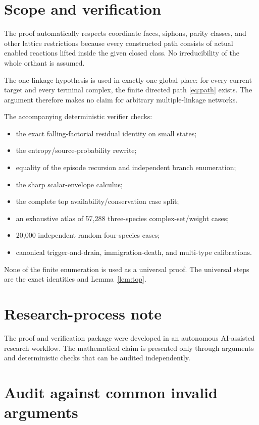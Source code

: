\documentclass[11pt]{article}
\theoremstyle{definition}
\begin{document}
\section{Scope and verification}

The proof automatically respects coordinate faces, siphons, parity classes,
and other lattice restrictions because every constructed path consists of
actual enabled reactions lifted inside the given closed class.  No
irreducibility of the whole orthant is assumed.

The one-linkage hypothesis is used in exactly one global place: for every
current target and every terminal complex, the finite directed path
\eqref{eq:path} exists.  The argument therefore makes no claim for arbitrary
multiple-linkage networks.

The accompanying deterministic verifier checks:

\begin{itemize}[leftmargin=2em]
\item the exact falling-factorial residual identity on small states;
\item the entropy/source-probability rewrite;
\item equality of the episode recursion and independent branch enumeration;
\item the sharp scalar-envelope calculus;
\item the complete top availability/conservation case split;
\item an exhaustive atlas of 57,288 three-species complex-set/weight cases;
\item 20,000 independent random four-species cases;
\item canonical trigger-and-drain, immigration-death, and multi-type
      calibrations.
\end{itemize}

None of the finite enumeration is used as a universal proof.  The universal
steps are the exact identities and Lemma~\ref{lem:top}.

\section*{Research-process note}
The proof and verification package were developed in an autonomous
AI-assisted research workflow.  The mathematical claim is presented only
through arguments and deterministic checks that can be audited independently.

\appendix
\section{Audit against common invalid arguments}
\end{document}
